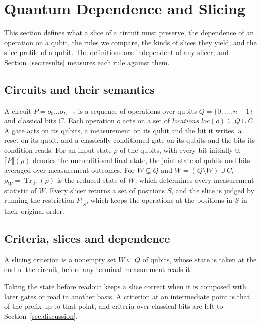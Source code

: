 \section{Quantum Dependence and Slicing}\label{sec:dependence}

This section defines what a slice of a circuit must preserve, the dependence of an operation on a qubit,
the rules we compare, the kinds of slices they yield, and the slice profile of a qubit. The definitions
are independent of any slicer, and Section~\ref{sec:results} measures each rule against them.

\subsection{Circuits and their semantics}
A circuit $P = o_0 \dots o_{L-1}$ is a sequence of operations over qubits $Q = \{0, \dots, n-1\}$ and
classical bits $C$. Each operation $o$ acts on a set of \emph{locations} $\mathit{loc}(o) \subseteq
Q \cup C$. A gate acts on its qubits, a measurement on its qubit and the bit it writes, a reset on its
qubit, and a classically conditioned gate on its qubits and the bits its condition reads. For an input
state $\rho$ of the qubits, with every bit initially $0$, $\llbracket P \rrbracket(\rho)$ denotes the
unconditional final state, the joint state of qubits and bits averaged over measurement
outcomes. For $W \subseteq Q$ and $\overline{W} = (Q \setminus W) \cup C$,
$\rho_W = \operatorname{Tr}_{\overline{W}}(\rho)$ is the reduced state of $W$, which determines every
measurement statistic of $W$. Every slicer returns a set of positions $S$, and the slice is judged by running the restriction
$P|_S$, which keeps the operations at the positions in $S$ in their original order.

\subsection{Criteria, slices and dependence}

\begin{definition}\label{def:criterion}
A slicing criterion is a nonempty set $W \subseteq Q$ of qubits, whose state is taken at the end of the
circuit, before any terminal measurement reads it.
\end{definition}

Taking the state before readout keeps a slice correct when it is composed with later gates or read in
another basis. A criterion at an intermediate point is that of the prefix up to that point, and criteria
over classical bits are left to Section~\ref{sec:discussion}.

